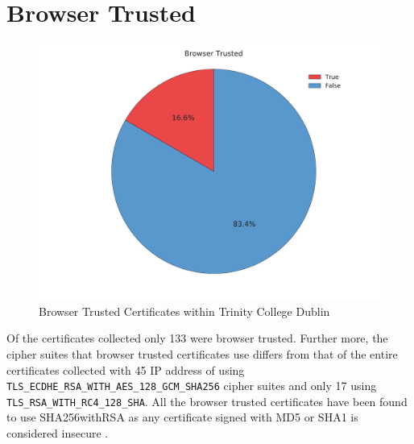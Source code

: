 \documentclass[a4wide,leqno,12pt]{report}
\begin{document}
\section{Browser Trusted}
\begin{figure}[H]
\centering
\includegraphics[scale=.45]{pdf_images/BrowserTrusted}
\caption{Browser Trusted Certificates within Trinity College Dublin}
\label{fig:browserTrusted}
\end{figure}
Of the certificates collected only 133 were browser trusted. Further more, the cipher suites that browser trusted certificates use differs from that of the entire certificates collected with 45 IP address of using\\ \texttt{TLS\_ECDHE\_RSA\_WITH\_AES\_128\_GCM\_SHA256} cipher suites and only 17 using \texttt{TLS\_RSA\_WITH\_RC4\_128\_SHA}. All the browser trusted certificates have been found to use SHA256withRSA as any certificate signed with MD5 or SHA1 is considered insecure \cite{ssllabs}.
\end{document}
